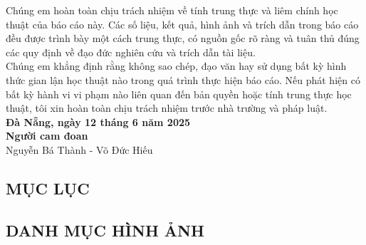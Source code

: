 \documentclass[a4paper,13pt]{article}
\renewcommand{\listfigurename}{}
\begin{document}
Chúng em hoàn toàn chịu trách nhiệm về tính trung thực và liêm chính học thuật của báo cáo này. Các số liệu, kết quả, hình ảnh và trích dẫn trong báo cáo đều được trình bày một cách trung thực, có nguồn gốc rõ ràng và tuân thủ đúng các quy định về đạo đức nghiên cứu và trích dẫn tài liệu.\\

Chúng em khẳng định rằng không sao chép, đạo văn hay sử dụng bất kỳ hình thức gian lận học thuật nào trong quá trình thực hiện báo cáo. Nếu phát hiện có bất kỳ hành vi vi phạm nào liên quan đến bản quyền hoặc tính trung thực học thuật, tôi xin hoàn toàn chịu trách nhiệm trước nhà trường và pháp luật.\\

\textbf{\hspace{7cm} Đà Nẵng, ngày 12 tháng 6 năm 2025}\\

\textbf{\hspace{9cm} Người cam đoan} \\

\hspace{7cm} Nguyễn Bá Thành - Võ Đức Hiếu \\

\clearpage 
\begin{center}
\section{MỤC LỤC}
\end{center}

\renewcommand{\contentsname}{}
\tableofcontents %
\clearpage

\begin{center}
\section{DANH MỤC HÌNH ẢNH}
\renewcommand{\listfigurename}{}
\listoffigures
\end{center}
\end{document}
